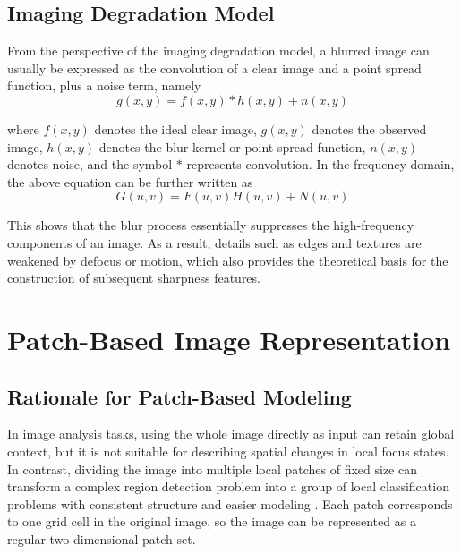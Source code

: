 \subsection{Imaging Degradation Model}
\par From the perspective of the imaging degradation model, a blurred image can
usually be expressed as the convolution of a clear image and a point spread
function, plus a noise term, namely
\begin{equation}
    g(x,y)=f(x,y)*h(x,y)+n(x,y)
    \label{eq:blur-model}
\end{equation}
\par where $f(x,y)$ denotes the ideal clear image, $g(x,y)$ denotes the
observed image, $h(x,y)$ denotes the blur kernel or point spread function,
$n(x,y)$ denotes noise, and the symbol $*$ represents convolution. In the
frequency domain, the above equation can be further written as
\begin{equation}
    G(u,v)=F(u,v)H(u,v)+N(u,v)
    \label{eq:blur-model-frequency}
\end{equation}
\par This shows that the blur process essentially suppresses the high-frequency
components of an image. As a result, details such as edges and textures are
weakened by defocus or motion, which also provides the theoretical basis for
the construction of subsequent sharpness features.

\section{Patch-Based Image Representation}
\subsection{Rationale for Patch-Based Modeling}
\par In image analysis tasks, using the whole image directly as input can retain
global context, but it is not suitable for describing spatial changes in local
focus states. In contrast, dividing the image into multiple local patches of
fixed size can transform a complex region detection problem into a group of
local classification problems with consistent structure and easier modeling
\cite{Hou_2016_CVPR}. Each patch corresponds to one grid cell in the original
image, so the image can be represented as a regular two-dimensional patch set.

